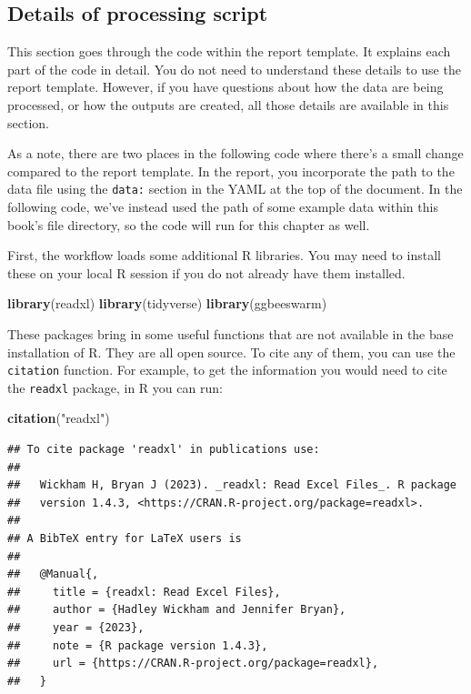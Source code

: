 \documentclass[
]{book}
\newenvironment{Shaded}{\begin{snugshade}}{\end{snugshade}}
\newcommand{\FunctionTok}[1]{\textcolor[rgb]{0.13,0.29,0.53}{\textbf{#1}}}
\newcommand{\NormalTok}[1]{#1}
\newcommand{\StringTok}[1]{\textcolor[rgb]{0.31,0.60,0.02}{#1}}
\begin{document}
\subsection{Details of processing script}\label{details-of-processing-script}

This section goes through the code within the report template. It
explains each part of the code in detail. You do not need to understand
these details to use the report template. However, if you have questions
about how the data are being processed, or how the outputs are created,
all those details are available in this section.

As a note, there are two places in the following code where there's a small
change compared to the report template. In the report, you incorporate the path
to the data file using the \texttt{data:} section in the YAML at the top of the
document. In the following code, we've instead used the path of some example
data within this book's file directory, so the code will run for this chapter as
well.

First, the workflow loads some additional R libraries. You may need to install
these on your local R session if you do not already have them installed.

\begin{Shaded}
\begin{Highlighting}[]
\FunctionTok{library}\NormalTok{(readxl)}
\FunctionTok{library}\NormalTok{(tidyverse)}
\FunctionTok{library}\NormalTok{(ggbeeswarm)}
\end{Highlighting}
\end{Shaded}

These packages bring in some useful functions that are not available in the
base installation of R. They are all open source. To cite any of them, you
can use the \texttt{citation} function. For example, to get the information you would
need to cite the \texttt{readxl} package, in R you can run:

\begin{Shaded}
\begin{Highlighting}[]
\FunctionTok{citation}\NormalTok{(}\StringTok{"readxl"}\NormalTok{)}
\end{Highlighting}
\end{Shaded}

\begin{verbatim}
## To cite package 'readxl' in publications use:
## 
##   Wickham H, Bryan J (2023). _readxl: Read Excel Files_. R package
##   version 1.4.3, <https://CRAN.R-project.org/package=readxl>.
## 
## A BibTeX entry for LaTeX users is
## 
##   @Manual{,
##     title = {readxl: Read Excel Files},
##     author = {Hadley Wickham and Jennifer Bryan},
##     year = {2023},
##     note = {R package version 1.4.3},
##     url = {https://CRAN.R-project.org/package=readxl},
##   }
\end{verbatim}
\end{document}
